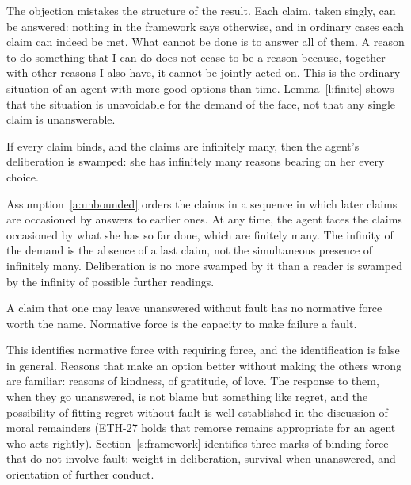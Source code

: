 \documentclass{situationist-preprint}
\begin{document}
\begin{reply}
The objection mistakes the structure of the result. Each claim, taken singly, can be answered: nothing in the framework says otherwise, and in ordinary cases each claim can indeed be met. What cannot be done is to answer all of them. A reason to do something that I can do does not cease to be a reason because, together with other reasons I also have, it cannot be jointly acted on. This is the ordinary situation of an agent with more good options than time. Lemma~\ref{l:finite} shows that the situation is unavoidable for the demand of the face, not that any single claim is unanswerable.
\end{reply}

\begin{objection}
If every claim binds, and the claims are infinitely many, then the agent's deliberation is swamped: she has infinitely many reasons bearing on her every choice.
\end{objection}

\begin{reply}
Assumption~\ref{a:unbounded} orders the claims in a sequence in which later claims are occasioned by answers to earlier ones. At any time, the agent faces the claims occasioned by what she has so far done, which are finitely many. The infinity of the demand is the absence of a last claim, not the simultaneous presence of infinitely many. Deliberation is no more swamped by it than a reader is swamped by the infinity of possible further readings.
\end{reply}

\begin{objection}
A claim that one may leave unanswered without fault has no normative force worth the name. Normative force is the capacity to make failure a fault.
\end{objection}

\begin{reply}
This identifies normative force with requiring force, and the identification is false in general. Reasons that make an option better without making the others wrong are familiar: reasons of kindness, of gratitude, of love. The response to them, when they go unanswered, is not blame but something like regret, and the possibility of fitting regret without fault is well established in the discussion of moral remainders (ETH-27 holds that remorse remains appropriate for an agent who acts rightly). Section~\ref{s:framework} identifies three marks of binding force that do not involve fault: weight in deliberation, survival when unanswered, and orientation of further conduct.
\end{reply}
\end{document}

